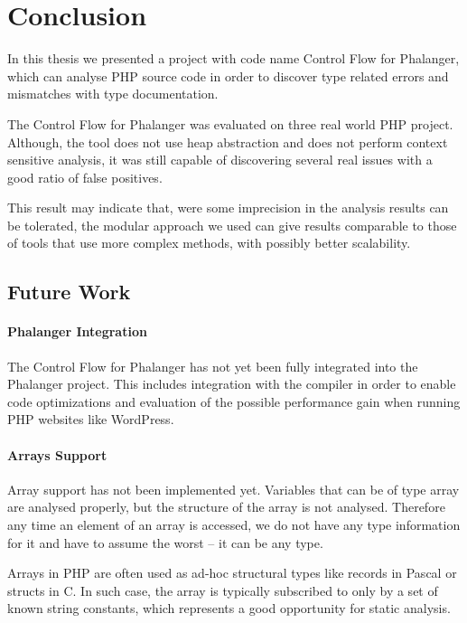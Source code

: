\chapter{Conclusion}

    In this thesis we presented a project with code name 
    Control Flow for Phalanger, which can analyse PHP 
    source code in order to discover type related errors 
    and mismatches with type documentation.
    
    The Control Flow for Phalanger was evaluated on 
    three real world PHP project. Although, the tool 
    does not use heap abstraction and 
    does not perform context sensitive analysis, it was 
    still capable of discovering several real 
    issues with a good ratio of false positives. 
    
    This result may indicate that, were some imprecision 
    in the analysis results can be tolerated, the 
    modular approach we used can give results comparable 
    to those of tools that use more complex methods, with 
    possibly better scalability.

    \section{Future Work}
    
        \subsubsection*{Phalanger Integration}
        The Control Flow for Phalanger has not yet been fully 
        integrated into the Phalanger project. This includes 
        integration with the compiler in order to enable 
        code optimizations and evaluation of the possible 
        performance gain when running PHP websites like WordPress.
        
        \subsubsection*{Arrays Support}
        Array support has not been implemented yet. Variables 
        that can be of type array are analysed properly, but 
        the structure of the array is not analysed. Therefore 
        any time an element of an array is accessed, we do not 
        have any type information for it and have to assume 
        the worst -- it can be any type.
        
        Arrays in PHP are often used as ad-hoc structural 
        types like records in Pascal or structs in C. 
        In such case, the array is typically subscribed to 
        only by a set of known string constants, 
        which represents a good opportunity for 
        static analysis.
        
